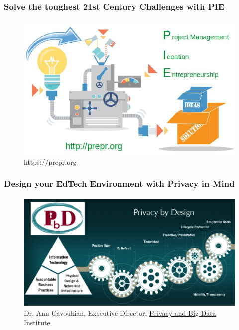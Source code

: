 \documentclass{beamer}
\begin{document}
	\begin{frame}
	\frametitle{Solve the toughest 21st Century Challenges with PIE\tiny\textsuperscript{\textregistered}}
	\framesubtitle{}
	        \begin{figure}[h]
                \centering
                \includegraphics[width=.8\textwidth]{./images/PIE_slide}
		\caption{\url{https://prepr.org}}
        	\end{figure}
	\end{frame}

	\begin{frame}
	\frametitle{Design your EdTech Environment with Privacy in Mind}
	\framesubtitle{}
	       	\begin{figure}[h]
               	\centering
               	\includegraphics[width=.8\textwidth]{./images/privacybydesign}
		\caption{Dr. Ann Cavoukian, Executive Director, \href{http://www.ryerson.ca/pbdi/privacy-by-design/certification/TheSevenFoundationalPrinciplesofPrivacybyDesign/}{Privacy and Big Data Institute}}
        	\end{figure}
	\end{frame}
\end{document}
